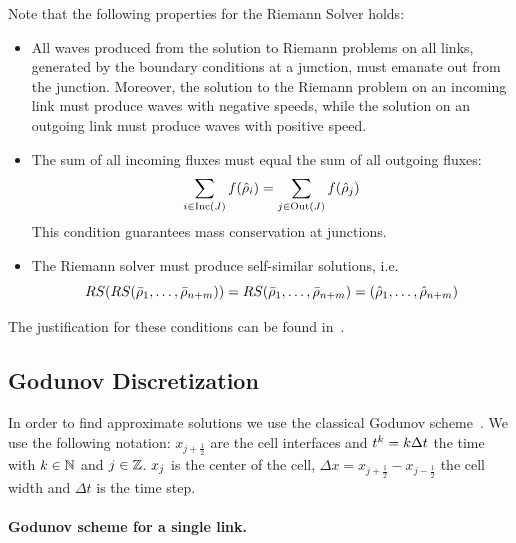 		
		Note that the following properties for the Riemann Solver holds:
		\begin{itemize}
			\item All waves produced from the solution to Riemann problems on all links,
			generated by the boundary conditions at a junction, must emanate out
			from the junction. Moreover, the solution to the Riemann problem
			on an incoming link must produce waves with negative speeds, while
			the solution on an outgoing link must produce waves with positive
			speed. 
			\item The sum of all incoming fluxes must equal the sum of all outgoing
			fluxes: 
			\[
				\sum_{i\in\Inc\left(\jn\right)}f\left(\trace{\cvar}_{\link}\right)=\sum_{j\in\Out\left(\jn\right)}f\left(\trace{\cvar}_{j}\right)
			\]
			This condition guarantees mass conservation at junctions.
			\item The Riemann solver must produce self-similar solutions, i.e. 
			\[
				\RS\left(\RS\tuple{\initstate_{1}}{\initstate_{\ninc+\nout}}\right)=\RS\tuple{\initstate_{1}}{\initstate_{\ninc+\nout}}=\tuple{\trace{\cvar}_{1}}{\trace{\cvar}_{\ninc+\nout}}
			\]
		\end{itemize}
		
		The justification for these conditions can be found in~\cite{garavello2006traffic}.
		
		
		\subsection{Godunov Discretization\label{sub:Godunov-Discretization}}
		
		In order to find approximate solutions we use the classical Godunov scheme~\cite{godunov1959}. We use the following notation: $x_{j+\frac{1}{2}}$ are the cell interfaces and   $t^{k}=k\Delta t$ the time with $k\in\mathbb{N}$ and $j\in\mathbb{Z}$. $x_{j}$ is the center of the cell, $\Delta x=x_{j+\frac{1}{2}}-x_{j-\frac{1}{2}}$ the cell width and $\Delta t$ is the time step. 
		\paragraph{Godunov scheme for a single link.}
		
